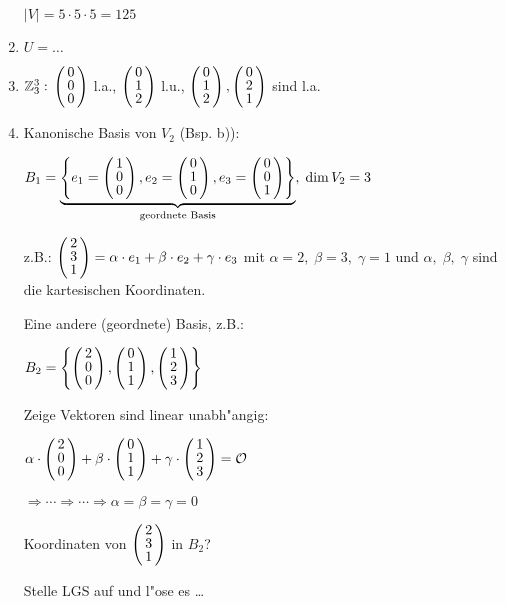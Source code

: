 \begin{enumerate}
	$|V| = 5 \cdot 5 \cdot 5 = 125$
	\item 
	$U = \dots$ %
 
	 \item
	 $\Z_3^3:\\
	 \vct{0 \\ 0 \\ 0}$ l.a., $\vct{0 \\ 1 \\2}$ l.u., $\vct{0 \\ 1 \\ 2}, \vct{0 \\ 2 \\ 1}$ sind l.a.
	 \item
	 Kanonische Basis von $V_2$ (Bsp. b)):
	 
	 $B_1 = \underbrace{\aset{e_1 = \vct{1 \\ 0 \\ 0}, e_2 = \vct{0 \\ 1 \\ 0}, e_3= \vct{0 \\ 0 \\ 1}}}_{\text{geordnete Basis}},\; \dim V_2 = 3$
	 
	 z.B.: $\vct{2 \\ 3 \\ 1}= \alpha \cdot e_1 + \beta \cdot e_2 + \gamma \cdot e_3$ mit $\alpha = 2, \;\beta = 3, \;\gamma =1 $ und $\alpha, \; \beta, \; \gamma $ sind die kartesischen Koordinaten.
	 
	 Eine andere (geordnete) Basis, z.B.:
	 
	 $B_2 = \aset {\vct{2 \\ 0 \\ 0}, \vct{0 \\ 1 \\ 1}, \vct{1 \\2 \\ 3}}$
	 
	 Zeige Vektoren sind linear unabh"angig:
	 
	 $\alpha \cdot \vct{2 \\ 0 \\ 0} + \beta \cdot \vct{0 \\  1\\ 1} + \gamma \cdot \vct{1 \\ 2 \\ 3} = \zerovec$
	 
	 $\Rightarrow  \cdots  \Rightarrow \cdots \Rightarrow \alpha = \beta = \gamma = 0$
	 
	 Koordinaten von $\vct{2 \\ 3 \\ 1}$ in $B_2$?
	 
	 Stelle LGS auf und l"ose es \dots
	 \end{enumerate}
